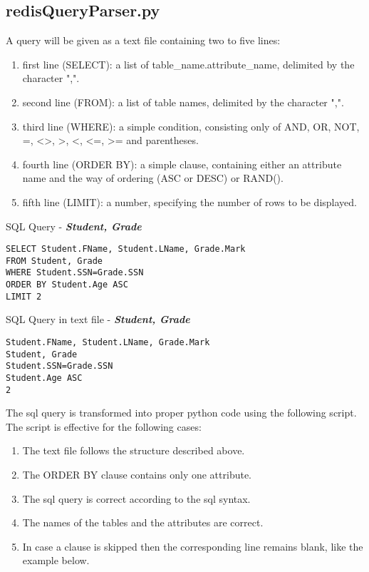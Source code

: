 \documentclass[11pt]{article}
\begin{document}
\subsection{redisQueryParser.py }\label{redisQueryParser.py}
A query will be given as a text file containing two to five lines:
\begin{enumerate}
	\item first line (SELECT): a list of table\_name.attribute\_name, delimited by the character ",".
	\item second line (FROM): a list of table names, delimited by the character ",".
	\item third line (WHERE): a simple condition, consisting only of AND, OR, NOT, =, <>, >, <, <=, >= and parentheses.
	\item fourth line (ORDER BY): a simple clause, containing either an attribute name and the way of ordering (ASC or DESC) or RAND().
	\item fifth line (LIMIT): a number, specifying the number of rows to be displayed.
\end{enumerate}

\noindent
SQL Query - \textbf{\emph{Student, Grade}}
\begin{center}
	\begin{verbatim}
SELECT Student.FName, Student.LName, Grade.Mark
FROM Student, Grade
WHERE Student.SSN=Grade.SSN
ORDER BY Student.Age ASC
LIMIT 2 
	\end{verbatim}
\end{center}

\noindent
SQL Query in text file - \textbf{\emph{Student, Grade}}
\begin{center}
	\begin{verbatim}
Student.FName, Student.LName, Grade.Mark
Student, Grade
Student.SSN=Grade.SSN
Student.Age ASC
2 
	\end{verbatim}
\end{center}

\noindent
The sql query is transformed into proper python code using the following script. The script is effective for the following cases:
\begin{enumerate}
	\item The text file follows the structure described above.
	\item The ORDER BY clause contains only one attribute.
	\item The sql query is correct according to the sql syntax.
	\item The names of the tables and the attributes are correct.
	\item In case a clause is skipped then the corresponding line remains blank, like the example below.
\end{enumerate}
\end{document}

